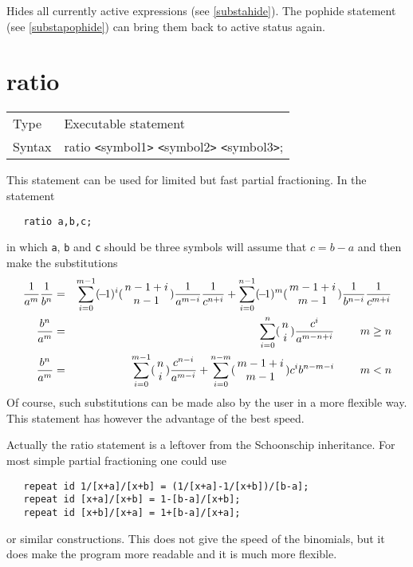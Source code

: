\noindent Hides all currently active 
expressions (see \ref{substahide}). The pophide statement 
(see \ref{substapophide}) can bring them back to active status again. 
\vspace{10mm}

 
\section{ratio}
\label{substaratio}

\noindent \begin{tabular}{ll}
Type & Executable statement\\
Syntax & ratio {\tt<}symbol1{\tt>} {\tt<}symbol2{\tt>} {\tt<}symbol3{\tt>};
\end{tabular} \vspace{4mm}

\noindent This statement can be used for limited but fast 
partial fractioning. In the statement
\begin{verbatim}
   ratio a,b,c;
\end{verbatim}
in which \verb:a:, \verb:b: and \verb:c: should be three symbols {\FORM} 
will assume that $c = b-a$ and then make the substitutions
\begin{eqnarray}
    \frac{1}{a^m}\frac{1}{b^n} & = & \sum_{i=0}^{m-1}\sign(i)
        \binom(n-1+i,n-1)\frac{1}{a^{m-i}}\frac{1}{c^{n+i}}
        +\sum_{i=0}^{n-1}\sign(m)
        \binom(m-1+i,m-1)\frac{1}{b^{n-i}}\frac{1}{c^{m+i}}
        \nonumber \\
    \frac{b^n}{a^m} & = & \sum_{i=0}^n\binom(n,i)\frac{c^i}{a^{m-n+i}}
            \ \ \ \ \ \ \ \hfill m\ge n \nonumber \\
    \frac{b^n}{a^m} & = & \sum_{i=0}^{m-1}\binom(n,i)\frac{c^{n-i}}{a^{m-i}}
        + \sum_{i=0}^{n-m}\binom(m-1+i,m-1)
            c^ib^{n-m-i}
            \ \ \ \ \ \ \ \hfill m<n \nonumber
\end{eqnarray}
Of course, such substitutions can be made also by the user in a more 
flexible way. This statement has however the advantage of the best speed.
\vspace{4mm}

\noindent Actually the ratio statement is a leftover from the 
Schoonschip 
inheritance. For most simple partial fractioning one could use
\begin{verbatim}
   repeat id 1/[x+a]/[x+b] = (1/[x+a]-1/[x+b])/[b-a];
   repeat id [x+a]/[x+b] = 1-[b-a]/[x+b];
   repeat id [x+b]/[x+a] = 1+[b-a]/[x+a];
\end{verbatim}
or similar constructions. This does not give the speed of the 
binomials, but it does make the program more readable and 
it is much more flexible.
\vspace{10mm}

